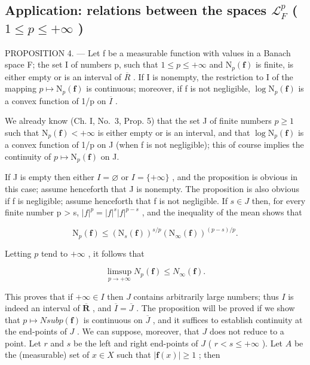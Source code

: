 \subsection{\texorpdfstring{Application: relations between the spaces \(\mathcal{L}_{F}^{p}\) ( \(1 \leqslant p \leqslant +\infty\) )}{Application: relations between the spaces L sub F to the p ( 1 <= p <= +infinity )}}

PROPOSITION 4. --- Let f be a measurable function with values in a Banach space F; the set I of numbers p, such that \(1 \leqslant p \leqslant +\infty\) and \(\mathrm{N}_{p}(\mathbf{f})\) is finite, is either empty or is an interval of \(\overline{R}\) . If I is nonempty, the restriction to I of the mapping \(p \mapsto \mathrm{N}_{p}(\mathbf{f})\) is continuous; moreover, if f is not negligible, \(\log \mathrm{N}_{p}(\mathbf{f})\) is a convex function of 1/p on \(\overline{I}\) .

We already know (Ch. I, No.~3, Prop. 5) that the set J of finite numbers \(p \geqslant 1\) such that \(\mathrm{N}_{p}(\mathbf{f}) < +\infty\) is either empty or is an interval, and that \(\log \mathrm{N}_{p}(\mathbf{f})\) is a convex function of 1/p on J (when f is not negligible); this of course implies the continuity of \(p \mapsto \mathrm{N}_{p}(\mathbf{f})\) on J.

If J is empty then either \(I = \varnothing\) or \(I = \{+\infty\}\) , and the proposition is obvious in this case; assume henceforth that J is nonempty. The proposition is also obvious if f is negligible; assume henceforth that f is not negligible. If \(s \in J\) then, for every finite number p \textgreater{} s, \(|f|^{p} = |f|^{s}|f|^{p-s}\) , and the inequality of the mean shows that

\[
\mathrm{N} _ {p} (\mathbf {f}) \leqslant \left(\mathrm{N} _ {s} (\mathbf {f})\right) ^ {s / p} \left(\mathrm{N} _ {\infty} (\mathbf {f})\right) ^ {(p - s) / p}.\tag{12}
\]

Letting \(p\) tend to \(+\infty\) , it follows that

\[
\limsup _ {p \to + \infty} N _ {p} (\mathbf {f}) \leqslant N _ {\infty} (\mathbf {f})  .\tag{13}
\]

This proves that if \(+\infty \in I\) then \(J\) contains arbitrarily large numbers; thus \(I\) is indeed an interval of \(\overline{\mathbf{R}}\) , and \(\overline{I} = \overline{J}\) . The proposition will be proved if we show that \(p \mapsto N sub p(\mathbf{f})\) is continuous on \(\overline{J}\) , and it suffices to establish continuity at the end-points of \(J\) . We can suppose, moreover, that \(J\) does not reduce to a point. Let \(r\) and \(s\) be the left and right end-points of \(J\) ( \(r < s \leqslant +\infty\) ). Let \(A\) be the (measurable) set of \(x \in X\) such that \(|\mathbf{f}(x)| \geqslant 1\) ; then

